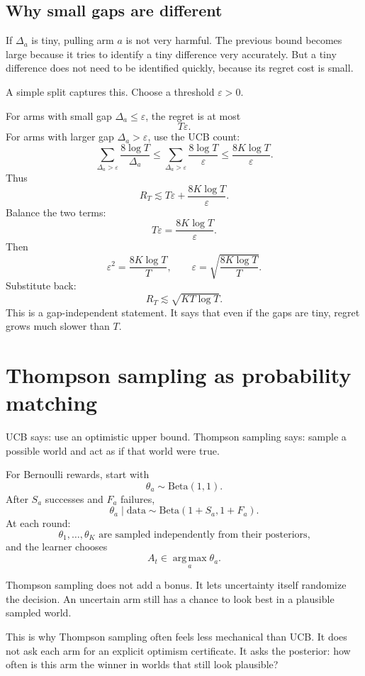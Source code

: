 \documentclass[en,nofont,11pt]{elegantbook}
\newcommand{\argmax}{\operatorname*{arg\,max}}
\begin{document}
\section{Why small gaps are different}

If $\Delta_a$ is tiny, pulling arm $a$ is not very harmful.  The previous bound becomes large because it tries to identify a tiny difference very accurately.  But a tiny difference does not need to be identified quickly, because its regret cost is small.

A simple split captures this.  Choose a threshold $\varepsilon>0$.

For arms with small gap $\Delta_a\le \varepsilon$, the regret is at most
\[
T\varepsilon.
\]
For arms with larger gap $\Delta_a>\varepsilon$, use the UCB count:
\[
\sum_{\Delta_a>\varepsilon}
\frac{8\log T}{\Delta_a}
\le
\sum_{\Delta_a>\varepsilon}
\frac{8\log T}{\varepsilon}
\le
\frac{8K\log T}{\varepsilon}.
\]
Thus
\[
R_T
\lesssim
T\varepsilon+\frac{8K\log T}{\varepsilon}.
\]
Balance the two terms:
\[
T\varepsilon
=
\frac{8K\log T}{\varepsilon}.
\]
Then
\[
\varepsilon^2
=
\frac{8K\log T}{T},
\qquad
\varepsilon
=
\sqrt{\frac{8K\log T}{T}}.
\]
Substitute back:
\[
R_T
\lesssim
\sqrt{KT\log T}.
\]
This is a gap-independent statement.  It says that even if the gaps are tiny, regret grows much slower than $T$.

\chapter{Thompson sampling as probability matching}

UCB says: use an optimistic upper bound.  Thompson sampling says: sample a possible world and act as if that world were true.

For Bernoulli rewards, start with
\[
\theta_a\sim \mathrm{Beta}(1,1).
\]
After $S_a$ successes and $F_a$ failures,
\[
\theta_a\mid \text{data}
\sim
\mathrm{Beta}(1+S_a,1+F_a).
\]
At each round:
\[
\theta_1,\ldots,\theta_K
\text{ are sampled independently from their posteriors,}
\]
and the learner chooses
\[
A_t\in\argmax_a \theta_a.
\]

\begin{think}
Thompson sampling does not add a bonus.  It lets uncertainty itself randomize the decision.  An uncertain arm still has a chance to look best in a plausible sampled world.
\end{think}

This is why Thompson sampling often feels less mechanical than UCB.  It does not ask each arm for an explicit optimism certificate.  It asks the posterior: how often is this arm the winner in worlds that still look plausible?
\end{document}
